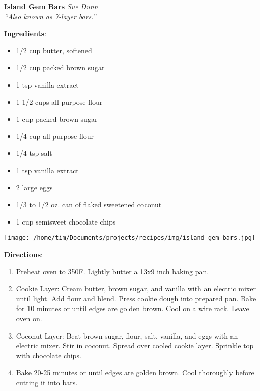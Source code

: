 \documentclass[11pt, twoside, openany]{book}
\begin{document}
\noindent\begin{minipage}[t]{\linewidth}%
{\Large\textbf{Island Gem Bars}} \label{island-gem-bars}\hfill\textit{Sue Dunn}\\
\textit{``Also known as 7-layer bars.''}\\
\noindent\begin{minipage}[t]{0.78\linewidth}%
\textbf{Ingredients}:\vspace{-3mm}
\begin{multicols}{2}
\begin{itemize}\setlength\itemsep{-1mm}
\item 1/2 cup butter, softened
\item 1/2 cup packed brown sugar
\item 1 tsp vanilla extract
\item 1 1/2 cups all-purpose flour
\item 1 cup packed brown sugar
\item 1/4 cup all-purpose flour
\item 1/4 tsp salt
\item 1 tsp vanilla extract
\item 2 large eggs
\item 1/3 to 1/2 oz. can of flaked sweetened coconut
\item 1 cup semisweet chocolate chips
\end{itemize}
\end{multicols}
\end{minipage}
\noindent\begin{minipage}[t]{0.18\linewidth}
\centering \strut\vspace*{-\baselineskip}\newline
\texttt{[image: /home/tim/Documents/projects/recipes/img/island-gem-bars.jpg]}\\
\end{minipage}\vspace{3mm}
\textbf{Directions}:
\vspace{-3mm}\begin{enumerate}\setlength\itemsep{-1mm}
\item Preheat oven to 350F. Lightly butter a 13x9 inch baking pan.
\item Cookie Layer: Cream butter, brown sugar, and vanilla with an electric mixer until light. Add flour and blend. Press cookie dough into prepared pan. Bake for 10 minutes or until edges are golden brown. Cool on a wire rack. Leave oven on.
\item Coconut Layer: Beat brown sugar, flour, salt, vanilla, and eggs with an electric mixer. Stir in coconut. Spread over cooled cookie layer. Sprinkle top with chocolate chips. 
\item Bake 20-25 minutes or until edges are golden brown. Cool thoroughly before cutting it into bars.
\end{enumerate}
\end{minipage}\vspace{8mm}
\end{document}
